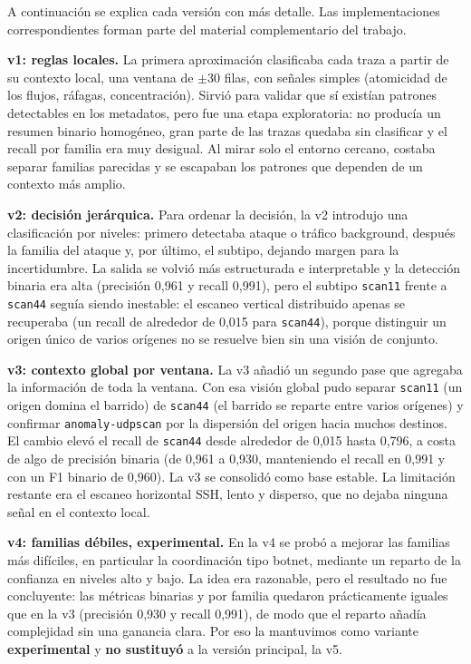 A continuación se explica cada versión con más detalle. Las implementaciones correspondientes forman parte del material complementario del trabajo.

\textbf{v1: reglas locales.} La primera aproximación clasificaba cada traza a partir de su contexto local, una ventana de $\pm$30 filas, con señales simples (atomicidad de los flujos, ráfagas, concentración). Sirvió para validar que sí existían patrones detectables en los metadatos, pero fue una etapa exploratoria: no producía un resumen binario homogéneo, gran parte de las trazas quedaba sin clasificar y el recall por familia era muy desigual. Al mirar solo el entorno cercano, costaba separar familias parecidas y se escapaban los patrones que dependen de un contexto más amplio.

\textbf{v2: decisión jerárquica.} Para ordenar la decisión, la v2 introdujo una clasificación por niveles: primero detectaba ataque o tráfico background, después la familia del ataque y, por último, el subtipo, dejando margen para la incertidumbre. La salida se volvió más estructurada e interpretable y la detección binaria era alta (precisión 0,961 y recall 0,991), pero el subtipo \texttt{scan11} frente a \texttt{scan44} seguía siendo inestable: el escaneo vertical distribuido apenas se recuperaba (un recall de alrededor de 0,015 para \texttt{scan44}), porque distinguir un origen único de varios orígenes no se resuelve bien sin una visión de conjunto.

\textbf{v3: contexto global por ventana.} La v3 añadió un segundo pase que agregaba la información de toda la ventana. Con esa visión global pudo separar \texttt{scan11} (un origen domina el barrido) de \texttt{scan44} (el barrido se reparte entre varios orígenes) y confirmar \texttt{anomaly-udpscan} por la dispersión del origen hacia muchos destinos. El cambio elevó el recall de \texttt{scan44} desde alrededor de 0,015 hasta 0,796, a costa de algo de precisión binaria (de 0,961 a 0,930, manteniendo el recall en 0,991 y con un F1 binario de 0,960). La v3 se consolidó como base estable. La limitación restante era el escaneo horizontal SSH, lento y disperso, que no dejaba ninguna señal en el contexto local.

\textbf{v4: familias débiles, experimental.} En la v4 se probó a mejorar las familias más difíciles, en particular la coordinación tipo botnet, mediante un reparto de la confianza en niveles alto y bajo. La idea era razonable, pero el resultado no fue concluyente: las métricas binarias y por familia quedaron prácticamente iguales que en la v3 (precisión 0,930 y recall 0,991), de modo que el reparto añadía complejidad sin una ganancia clara. Por eso la mantuvimos como variante \textbf{experimental} y \textbf{no sustituyó} a la versión principal, la v5.

